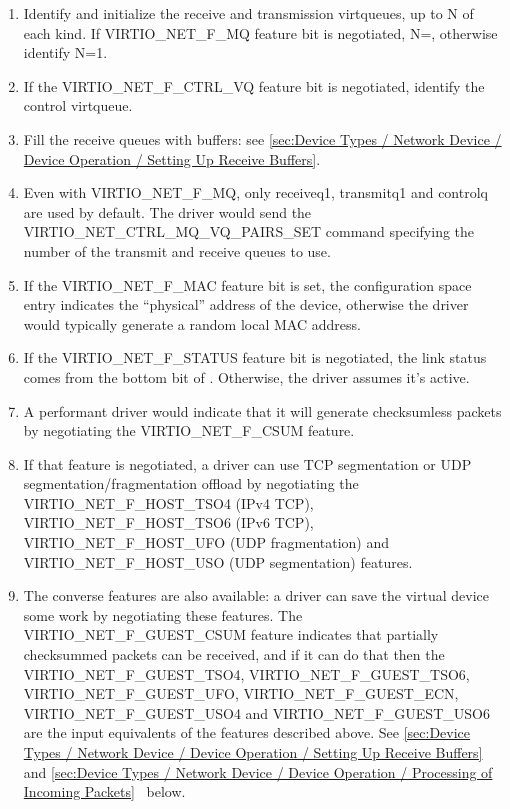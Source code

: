 \begin{enumerate}
\item Identify and initialize the receive and
  transmission virtqueues, up to N of each kind. If
  VIRTIO_NET_F_MQ feature bit is negotiated,
  N=, otherwise identify N=1.

\item If the VIRTIO_NET_F_CTRL_VQ feature bit is negotiated,
  identify the control virtqueue.

\item Fill the receive queues with buffers: see \ref{sec:Device Types / Network Device / Device Operation / Setting Up Receive Buffers}.

\item Even with VIRTIO_NET_F_MQ, only receiveq1, transmitq1 and
  controlq are used by default.  The driver would send the
  VIRTIO_NET_CTRL_MQ_VQ_PAIRS_SET command specifying the
  number of the transmit and receive queues to use.

\item If the VIRTIO_NET_F_MAC feature bit is set, the configuration
  space  entry indicates the ``physical'' address of the
  device, otherwise the driver would typically generate a random
  local MAC address.

\item If the VIRTIO_NET_F_STATUS feature bit is negotiated, the link
  status comes from the bottom bit of .
  Otherwise, the driver assumes it's active.

\item A performant driver would indicate that it will generate checksumless
  packets by negotiating the VIRTIO_NET_F_CSUM feature.

\item If that feature is negotiated, a driver can use TCP segmentation or UDP
  segmentation/fragmentation offload by negotiating the VIRTIO_NET_F_HOST_TSO4 (IPv4
  TCP), VIRTIO_NET_F_HOST_TSO6 (IPv6 TCP), VIRTIO_NET_F_HOST_UFO
  (UDP fragmentation) and VIRTIO_NET_F_HOST_USO (UDP segmentation) features.

\item The converse features are also available: a driver can save
  the virtual device some work by negotiating these features.
   The VIRTIO_NET_F_GUEST_CSUM feature indicates that partially
  checksummed packets can be received, and if it can do that then
  the VIRTIO_NET_F_GUEST_TSO4, VIRTIO_NET_F_GUEST_TSO6,
  VIRTIO_NET_F_GUEST_UFO, VIRTIO_NET_F_GUEST_ECN, VIRTIO_NET_F_GUEST_USO4
  and VIRTIO_NET_F_GUEST_USO6 are the input equivalents of the features described above.
  See \ref{sec:Device Types / Network Device / Device Operation /
Setting Up Receive Buffers}~ and
\ref{sec:Device Types / Network Device / Device Operation /
Processing of Incoming Packets}~ below.
\end{enumerate}

